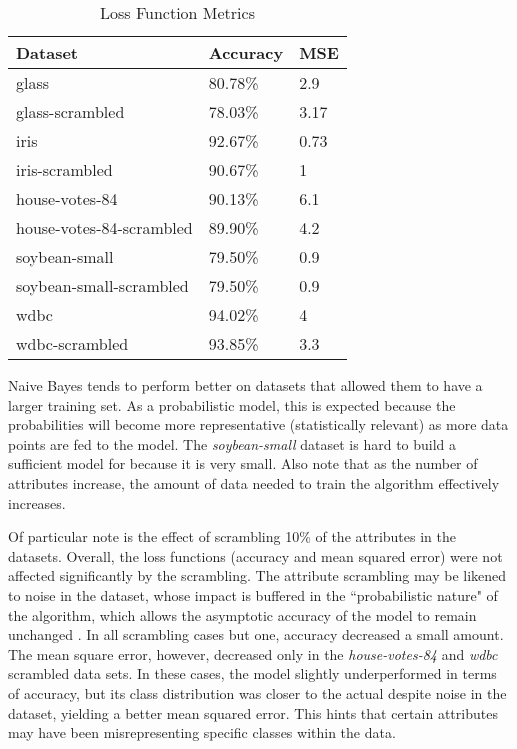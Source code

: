 \documentclass[twoside,11pt]{article}
\begin{document}
\begin{table}[h]
	\centering
	\caption{Loss Function Metrics} \label{tab:metrics}
	\begin{tabular}{|l|l|l|}
		\hline
		Dataset                  & Accuracy & MSE  \\ \hline
		glass                    & 80.78\%  & 2.9  \\ \hline
		glass-scrambled          & 78.03\%  & 3.17 \\ \hline
		iris                     & 92.67\%  & 0.73 \\ \hline
		iris-scrambled           & 90.67\%  & 1    \\ \hline
		house-votes-84           & 90.13\%  & 6.1  \\ \hline
		house-votes-84-scrambled & 89.90\%  & 4.2  \\ \hline
		soybean-small            & 79.50\%  & 0.9  \\ \hline
		soybean-small-scrambled  & 79.50\%  & 0.9  \\ \hline
		wdbc                     & 94.02\%  & 4    \\ \hline
		wdbc-scrambled           & 93.85\%  & 3.3  \\ \hline
	\end{tabular}
\end{table}

Naive Bayes tends to perform better on datasets that allowed them to have a larger training set. As a probabilistic model, this is expected because the probabilities will become more representative (statistically relevant) as more data points are fed to the model. The \emph{soybean-small} dataset is hard to build a sufficient model for because it is very small. Also note that as the number of attributes increase, the amount of data needed to train the algorithm effectively increases.

Of particular note is the effect of scrambling 10\% of the attributes in the datasets. Overall, the loss functions (accuracy and mean squared error) were not affected significantly by the scrambling. The attribute scrambling may be likened to noise in the dataset, whose impact is buffered in the ``probabilistic nature" of the algorithm, which allows the asymptotic accuracy of the model to remain unchanged \citep{nbPaper}. In all scrambling cases but one, accuracy decreased a small amount. The mean square error, however, decreased only in the \emph{house-votes-84} and \emph{wdbc} scrambled data sets. In these cases, the model slightly underperformed in terms of accuracy, but its class distribution was closer to the actual despite noise in the dataset, yielding a better mean squared error. This hints that certain attributes may have been misrepresenting specific classes within the data.
\end{document}

